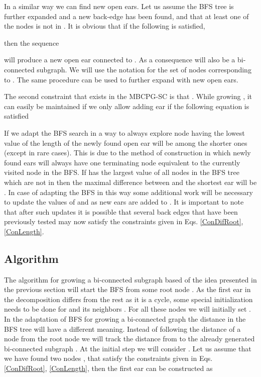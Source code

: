 In a similar way we can find new open ears. Let us assume the BFS tree is further expanded and a new back-edge  has been found, and that at least one of the nodes  is not in . It is obvious  that if the following is satisfied, 

then the sequence 

 will produce a new open ear connected to . As a consequence  will also be a bi-connected subgraph. We will use the notation  for the set of nodes corresponding to . The same procedure can be used to further expand  with new open ears.
 
 The second constraint that exists in the MBCPG-SC is that . While growing , it can easily be maintained if we only allow adding  ear  if the following equation is satisfied 

If we adapt the BFS search in a way to always explore node  having the lowest value of  the length  of the newly found open ear will be among the shorter ones (except in rare cases).  This is due to the method of construction in which newly  found ears will always have one terminating node equivalent to the currently visited node in the BFS. If  has the largest value of all nodes in the BFS tree which are not in  then the maximal   difference between  and the shortest ear will be .  In case of adapting the BFS in this way some additional work will be necessary to update the values of  and  as new ears are added to . It is important to note that after such updates it is possible that several back edges  that have been previously tested may now satisfy the constraints given in Eqs. \eqref{ConDifRoot},\eqref{ConLength}.  

\subsection{Algorithm}

The algorithm for growing a bi-connected subgraph  based of the idea presented in the previous section will start the BFS from some root node . As the first ear in the decomposition  differs from the rest as it is a cycle, some special initialization needs to be done for  and its neighbors . For all these nodes  we will initially set . In the adaptation of BFS for growing a bi-connected graph the distance in the BFS tree will have a different meaning. Instead of following the distance of a node  from the root node  we will track the distance from  to the already generated bi-connected subgraph . At the initial step we will consider . Let us assume that we have found two nodes ,  that satisfy the constraints given in Eqs. \eqref{ConDifRoot}, \eqref{ConLength}, then the first ear   can be constructed as 
 

